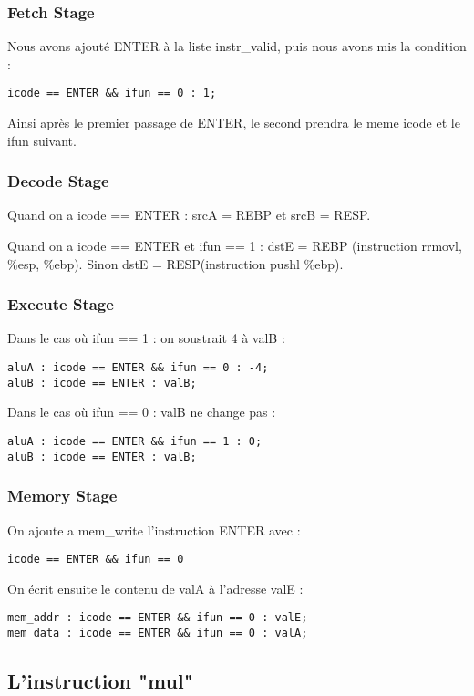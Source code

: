\documentclass[12pt]{article}
\begin{document}
\subsubsection{Fetch Stage}
Nous avons ajouté ENTER à la liste instr\_valid, puis nous avons mis la condition : 
\begin{verbatim}
icode == ENTER && ifun == 0 : 1;
\end{verbatim}

Ainsi après le premier passage de ENTER, le second prendra le meme icode et le ifun suivant.

\subsubsection{Decode Stage}
Quand on a icode == ENTER : srcA = REBP et srcB = RESP.

Quand on a icode == ENTER et ifun == 1 : dstE = REBP (instruction rrmovl, \%esp, \%ebp). Sinon dstE = RESP(instruction pushl \%ebp).

\subsubsection{Execute Stage}
Dans le cas où ifun == 1 : on soustrait 4 à valB :
\begin{verbatim}
aluA : icode == ENTER && ifun == 0 : -4;
aluB : icode == ENTER : valB;
\end{verbatim}

Dans le cas où ifun == 0 : valB ne change pas :
\begin{verbatim}
aluA : icode == ENTER && ifun == 1 : 0;
aluB : icode == ENTER : valB;
\end{verbatim}

\subsubsection{Memory Stage}
On ajoute a mem\_write l'instruction ENTER avec :
\begin{verbatim}
icode == ENTER && ifun == 0
\end{verbatim}

On écrit ensuite le contenu de valA à l'adresse valE :
\begin{verbatim}
mem_addr : icode == ENTER && ifun == 0 : valE;
mem_data : icode == ENTER && ifun == 0 : valA;
\end{verbatim}

\subsection{L'instruction "mul"}
\end{document}

